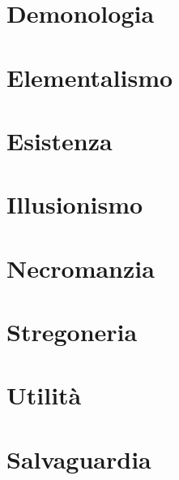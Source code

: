 \section{Demonologia}
\section{Elementalismo}
\section{Esistenza}
\section{Illusionismo}
\section{Necromanzia}
\section{Stregoneria}
\section{Utilit\`a}
\section{Salvaguardia}